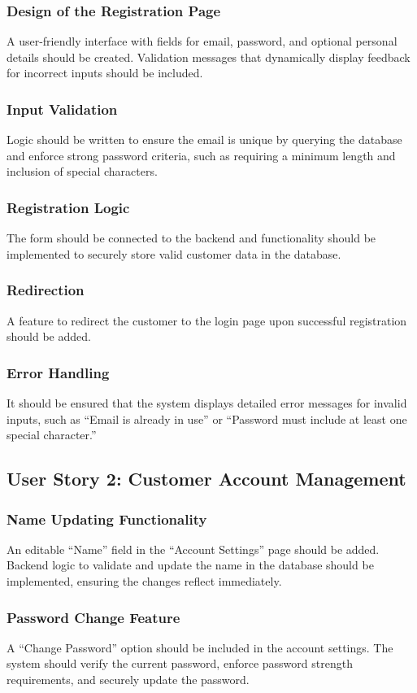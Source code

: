 \documentclass[twoside,a4paper,journal]{IEEEtran}
\begin{document}
\subsubsection{Design of the Registration Page}
A user-friendly interface with fields for email, password, and optional personal
details should be created.
Validation messages that dynamically display feedback for incorrect inputs
should be included.
\subsubsection{Input Validation}
Logic should be written to ensure the email is unique by querying the database
and enforce strong password criteria, such as requiring a minimum length and
inclusion of special characters.
\subsubsection{Registration Logic}
The form should be connected to the backend and functionality should be
implemented to securely store valid customer data in the database.
\subsubsection{Redirection}
A feature to redirect the customer to the login page upon successful
registration should be added.
\subsubsection{Error Handling}
It should be ensured that the system displays detailed error messages for
invalid inputs, such as
``Email is already in use'' or
``Password must include at least one special character.''

\subsection{User Story 2: Customer Account Management}
\subsubsection{Name Updating Functionality}
An editable ``Name'' field in the ``Account Settings'' page should be added.
Backend logic to validate and update the name in the database should be
implemented, ensuring the changes reflect immediately.
\subsubsection{Password Change Feature}
A ``Change Password'' option should be included in the account settings.
The system should verify the current password, enforce password strength
requirements, and securely update the password.
\end{document}

